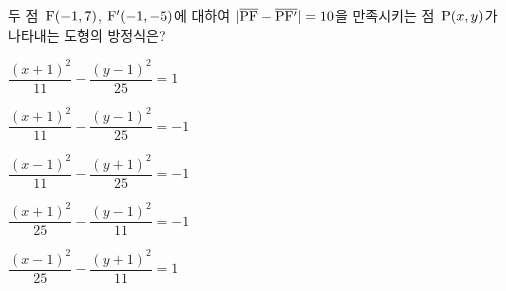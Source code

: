 두 점~$\mathrm{F}(-1{,}\mkern3mu\mathopen{}7)$, $\mathrm{F'}(-1{,}\mkern3mu\mathopen{}-5)$에 대하여 $|\overline{\mathrm{PF}}-\overline{\mathrm{PF'}}|=10$을 만족시키는 점~$\mathrm{P}(x{,}\mkern3mu\mathopen{}y)$가 나타내는 도형의 방정식은?
\begin{choicesv}{\rule[-3ex]{0pt}{8ex}$\dfrac{(x+1)^2}{11}-\dfrac{(y-1)^2}{25}=1$}{\rule[-3ex]{0pt}{8ex}$\dfrac{(x+1)^2}{11}-\dfrac{(y-1)^2}{25}=-1$}{\rule[-3ex]{0pt}{8ex}$\dfrac{(x-1)^2}{11}-\dfrac{(y+1)^2}{25}=-1$}{\rule[-3ex]{0pt}{8ex}$\dfrac{(x+1)^2}{25}-\dfrac{(y-1)^2}{11}=-1$}{\rule[-3ex]{0pt}{8ex}$\dfrac{(x-1)^2}{25}-\dfrac{(y+1)^2}{11}=1$}\end{choicesv}
